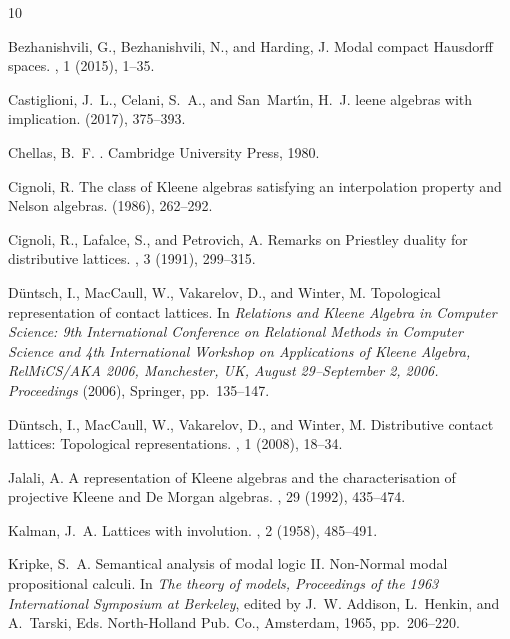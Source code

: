 \documentclass{article}
\begin{document}
\begin{thebibliography}{10}

{\sc Bezhanishvili, G., Bezhanishvili, N., and Harding, J.}
\newblock Modal compact {H}ausdorff spaces.
, 1 (2015), 1--35.

{\sc Castiglioni, J.~L., Celani, S.~A., and San~Mart{\'\i}n, H.~J.}
leene algebras with implication.
 (2017), 375--393.

{\sc Chellas, B.~F.}
.
\newblock Cambridge University Press, 1980.

{\sc Cignoli, R.}
\newblock The class of {K}leene algebras satisfying an interpolation property and {N}elson algebras.
 (1986), 262--292.

{\sc Cignoli, R., Lafalce, S., and Petrovich, A.}
\newblock Remarks on {P}riestley duality for distributive lattices.
, 3 (1991), 299--315.

{\sc D{\"u}ntsch, I., MacCaull, W., Vakarelov, D., and Winter, M.}
\newblock Topological representation of contact lattices.
\newblock In {\em Relations and Kleene Algebra in Computer Science: 9th International Conference on Relational Methods in Computer Science and 4th International Workshop on Applications of Kleene Algebra, RelMiCS/AKA 2006, Manchester, UK, August 29--September 2, 2006. Proceedings \/} (2006), Springer, pp.~135--147.

{\sc D{\"u}ntsch, I., MacCaull, W., Vakarelov, D., and Winter, M.}
\newblock Distributive contact lattices: {T}opological representations.
, 1 (2008), 18--34.

{\sc Jalali, A.}
\newblock A representation of {K}leene algebras and the characterisation of projective {K}leene and {D}e {M}organ algebras.
, 29 (1992), 435--474.

{\sc Kalman, J.~A.}
\newblock Lattices with involution.
, 2 (1958), 485--491.

{\sc Kripke, S.~A.}
\newblock Semantical analysis of modal logic {II}. {Non-Normal} modal propositional calculi.
\newblock In {\em The theory of models, Proceedings of the 1963 International Symposium at Berkeley}, edited by J.~W. Addison, L.~Henkin, and A.~Tarski, Eds. North-Holland Pub. Co., Amsterdam, 1965, pp.~206--220.


\end{thebibliography}
\end{document}
